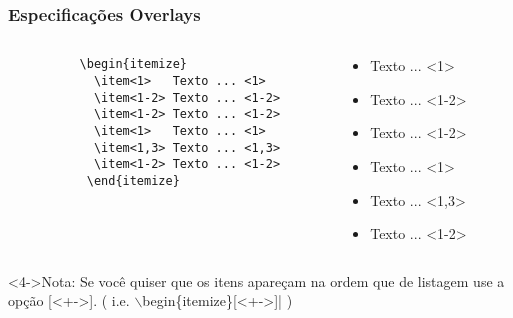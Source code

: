 \begin{frame}[fragile]
  \frametitle{Especificações Overlays}

    \begin{columns}
      \begin{column}[c]{5cm}
        \begin{verbatim}
          \begin{itemize}
            \item<1>   Texto ... <1>
            \item<1-2> Texto ... <1-2>
            \item<1-2> Texto ... <1-2>
            \item<1>   Texto ... <1>
            \item<1,3> Texto ... <1,3>
            \item<1-2> Texto ... <1-2>
           \end{itemize}
       \end{verbatim}

      \end{column}

      \begin{column}[c]{5cm}
         \begin{itemize}
          \item<1>   Texto ... <1>
          \item<1-2> Texto ... <1-2>
          \item<1-2> Texto ... <1-2>
          \item<1>   Texto ... <1>
          \item<1,3> Texto ... <1,3>
          \item<1-2> Texto ... <1-2>
        \end{itemize}
      \end{column}
    \end{columns}

  \begin{block}<4->{Nota:}{\small
    Se você quiser que os itens apareçam na ordem que de listagem use a opção
    [<+->]. ( i.e. $\backslash$begin\{itemize\}[<+->]| )}
  \end{block}

\end{frame}


